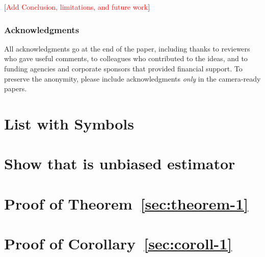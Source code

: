 \documentclass[twoside]{article}
\newcommand{\todo}[1]{[\textcolor{red}{#1}]}
\begin{document}
\todo{Add Conclusion, limitations, and future work}

\subsubsection*{Acknowledgments}
All acknowledgments go at the end of the paper, including thanks to reviewers who gave useful comments, to colleagues who contributed to the ideas, and to funding agencies and corporate sponsors that provided financial support. 
To preserve the anonymity, please include acknowledgments \emph{only} in the camera-ready papers.



\appendix

\section{List with Symbols}
\label{sec:list-with-symbols}

\section{Show that is unbiased estimator}
\label{sec:proof-1}

\section{Proof of Theorem~\ref{sec:theorem-1}}
\label{sec:proof-of-3-1}

\section{Proof of Corollary~\ref{sec:coroll-1}}
\label{sec:proof-of-coroll}
\end{document}
